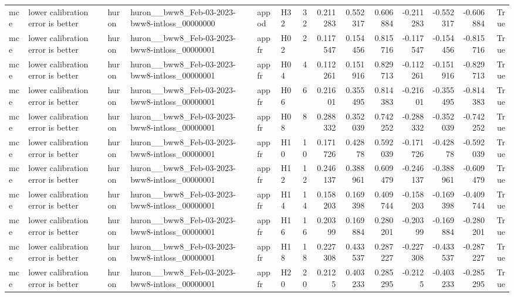 \begin{longtable}{llllllrrrrrrrr}
mce & lower calibration error is better & huron & huron\_\_bww8\_Feb-03-2023-bww8-intloss\_00000000 & appod & H32 & 32 & 0.211283 & 0.552317 & 0.606884 & -0.211283 & -0.552317 & -0.606884 & True \\
mce & lower calibration error is better & huron & huron\_\_bww8\_Feb-03-2023-bww8-intloss\_00000001 & appfr & H02 & 2 & 0.117547 & 0.154456 & 0.815716 & -0.117547 & -0.154456 & -0.815716 & True \\
mce & lower calibration error is better & huron & huron\_\_bww8\_Feb-03-2023-bww8-intloss\_00000001 & appfr & H04 & 4 & 0.112261 & 0.151916 & 0.829713 & -0.112261 & -0.151916 & -0.829713 & True \\
mce & lower calibration error is better & huron & huron\_\_bww8\_Feb-03-2023-bww8-intloss\_00000001 & appfr & H06 & 6 & 0.21601 & 0.355495 & 0.814383 & -0.21601 & -0.355495 & -0.814383 & True \\
mce & lower calibration error is better & huron & huron\_\_bww8\_Feb-03-2023-bww8-intloss\_00000001 & appfr & H08 & 8 & 0.288332 & 0.352039 & 0.742252 & -0.288332 & -0.352039 & -0.742252 & True \\
mce & lower calibration error is better & huron & huron\_\_bww8\_Feb-03-2023-bww8-intloss\_00000001 & appfr & H10 & 10 & 0.171726 & 0.42878 & 0.592039 & -0.171726 & -0.42878 & -0.592039 & True \\
mce & lower calibration error is better & huron & huron\_\_bww8\_Feb-03-2023-bww8-intloss\_00000001 & appfr & H12 & 12 & 0.246137 & 0.388961 & 0.609479 & -0.246137 & -0.388961 & -0.609479 & True \\
mce & lower calibration error is better & huron & huron\_\_bww8\_Feb-03-2023-bww8-intloss\_00000001 & appfr & H14 & 14 & 0.158203 & 0.169398 & 0.409744 & -0.158203 & -0.169398 & -0.409744 & True \\
mce & lower calibration error is better & huron & huron\_\_bww8\_Feb-03-2023-bww8-intloss\_00000001 & appfr & H16 & 16 & 0.20399 & 0.169884 & 0.280201 & -0.20399 & -0.169884 & -0.280201 & True \\
mce & lower calibration error is better & huron & huron\_\_bww8\_Feb-03-2023-bww8-intloss\_00000001 & appfr & H18 & 18 & 0.227308 & 0.433537 & 0.287227 & -0.227308 & -0.433537 & -0.287227 & True \\
mce & lower calibration error is better & huron & huron\_\_bww8\_Feb-03-2023-bww8-intloss\_00000001 & appfr & H20 & 20 & 0.2125 & 0.403233 & 0.285295 & -0.2125 & -0.403233 & -0.285295 & True \\

\end{longtable}
